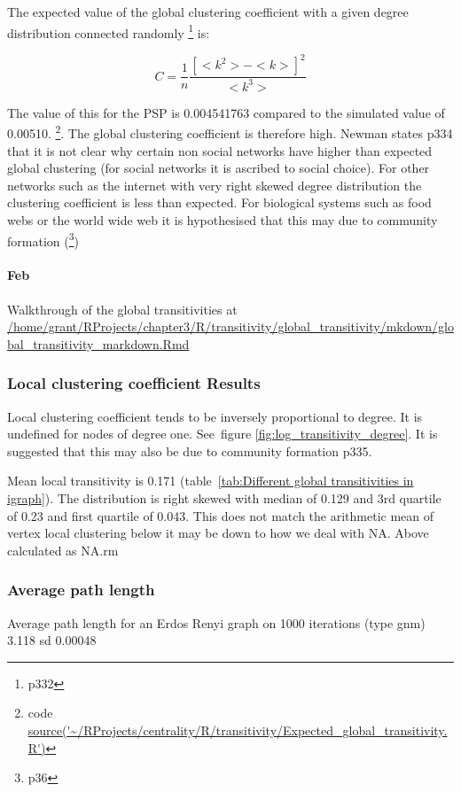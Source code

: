 The expected value of the global clustering coefficient with a given degree distribution connected randomly \cite{newman2018networks}\footnote{p332} is:

\begin{equation}
    C=\frac{1}{n}\frac{[<k^2> - <k>]^2}{<k^3>}
\end{equation}


The value of this for the PSP is 0.004541763 compared to the simulated value of 0.00510. \footnote{code \url{source('~/RProjects/centrality/R/transitivity/Expected_global_transitivity.R')}}. The global clustering coefficient is therefore high. Newman states p334 \cite{newman2018networks} that it is not clear why certain non social networks have higher than expected global clustering (for social networks it is ascribed to social choice). For other networks such as the internet with very right skewed degree distribution the clustering coefficient is less than expected. For biological systems such as food webs or the world wide web it is hypothesised that this may due to community formation (\cite{newman2018networks}\footnote{p36})


\paragraph{Feb}
Walkthrough of the global transitivities at \url{/home/grant/RProjects/chapter3/R/transitivity/global_transitivity/mkdown/global_transitivity_markdown.Rmd}




\subsubsection{Local clustering coefficient Results}
Local clustering coefficient tends to be inversely proportional to degree. It is undefined for nodes of degree one. See~figure \ref{fig:log_transitivity_degree}. It is suggested that this may also be due to community formation \cite{newman2018networks} p335.

Mean local transitivity is 0.171 (table~\ref{tab:Different global transitivities in igraph}). The distribution is right skewed with median of 0.129 and 3rd quartile of 0.23 and first quartile of 0.043. This does not match the arithmetic mean of vertex local clustering below it may be down to how we deal with NA. Above calculated as NA.rm
\subsubsection{Average path length}
Average path length for an Erdos Renyi graph on 1000 iterations (type gnm) 3.118 sd 0.00048

